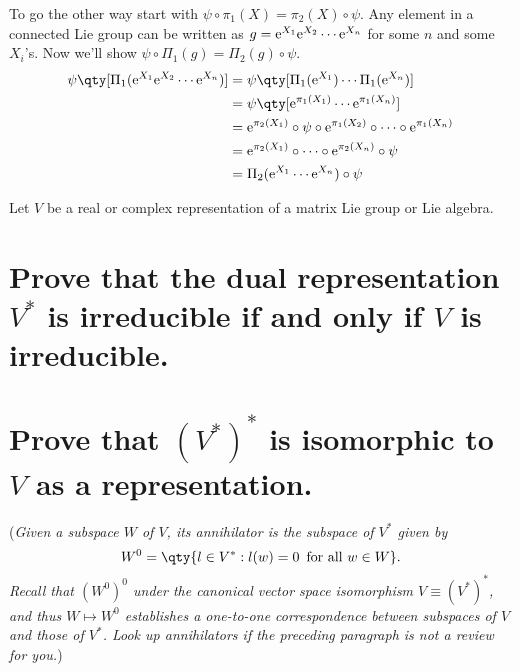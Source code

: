 \documentclass[
	pages,
	boxes,
	color=WildStrawberry
]{homework}
\begin{document}
\begin{solution}
	To go the other way start with $\psi\circ\pi_1(X) = \pi_2(X)\circ\psi$. Any element in a connected Lie group can be written as $g = \mathrm{e}^{X_1}\mathrm{e}^{X_2}\cdots\mathrm{e}^{X_n}$ for some $n$ and some $X_i$'s. Now we'll show $\psi\circ \Pi_1(g) = \Pi_2(g)\circ \psi$.
	\begin{align*}
		\psi\qty[\Pi_1(\e^{X_1}\e^{X_2}\cdots\e^{X_n})] & = \psi\qty[\Pi_1(\e^{X_1})\cdots\Pi_1(\e^{X_n})]                              \\
		                                                & = \psi\qty[\e^{\pi_1(X_1)}\cdots\e^{\pi_1(X_n)}]                              \\
		                                                & = \e^{\pi_2(X_1)}\circ\psi\circ\e^{\pi_1(X_2)}\circ\cdots\circ\e^{\pi_1(X_n)} \\
		                                                & = \e^{\pi_2(X_1)}\circ\cdots\circ\e^{\pi_2(X_n)}\circ\psi                     \\
		                                                & = \Pi_2(\e^{X_1}\cdots\e^{X_n})\circ\psi
	\end{align*}
\end{solution}

\begin{problem}
Let $V$ be a real or complex representation of a matrix Lie group or Lie algebra.
\begin{parts}
	\part{Prove that the dual representation $V^*$ is irreducible if and only if $V$ is irreducible.}\label{part:3a}
	\part{Prove that $(V^*)^*$ is isomorphic to $V$ as a representation.}\label{part:3b}

	(\textit{Given a subspace $W$ of $V$, its annihilator is the subspace of $V^*$ given by
		\[
			W^{0}= \qty{l \in V^* : l(w) = 0 \,\text{ for all }w \in W}.
		\]
		Recall that $(W^{0})^{0}$ under the canonical vector space isomorphism $V \equiv (V^*)^*$, and thus $W \mapsto W^{0}$ establishes a one-to-one correspondence between subspaces of $V$ and those of $V^*$. Look up annihilators if the preceding paragraph is not a review for you.})
\end{parts}
\end{problem}
\end{document}
